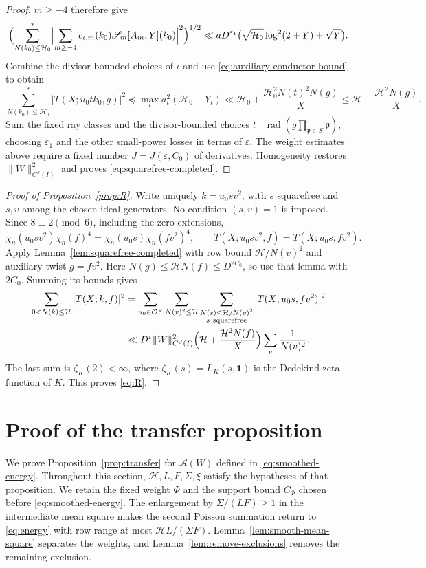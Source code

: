 \documentclass[11pt,a4paper]{article}
\numberwithin{equation}{section}
\numberwithin{figure}{section}
\theoremstyle{definition}
\theoremstyle{remark}
\newcommand{\OO}{\mathcal O}
\newcommand{\rad}{\operatorname{rad}}
\newcommand{\precbd}{\preccurlyeq}
\begin{document}
\begin{proof}
$m\ge-4$ therefore give
\[
 \Bigl(\sum_{N(k_0)\le\mathcal H_0}^*
   \Bigl|\sum_{m\ge-4}c_{\iota,m}(k_0)
       \mathscr S_m[A_m,Y](k_0)\Bigr|^2\Bigr)^{1/2}
 \ll aD^{\varepsilon_1}
       \bigl(\sqrt{\mathcal H_0}\log^2(2+Y)+\sqrt Y\bigr).
\]
Combine the divisor-bounded choices of $\iota$ and use
\eqref{eq:auxiliary-conductor-bound} to obtain
\[
 \sum_{N(k_0)\le\mathcal H_0}^*|T(X;u_0tk_0,g)|^2
 \precbd\max_\iota a_\iota^2(\mathcal H_0+Y_\iota)
 \ll\mathcal H_0+\frac{\mathcal H_0^2N(t)^2N(g)}X
 \le\mathcal H+\frac{\mathcal H^2N(g)}X.
\]
Sum the fixed ray classes and the divisor-bounded choices
$t\mid\rad(g\prod_{\mathfrak p\in S}\mathfrak p)$, choosing
$\varepsilon_1$ and the other small-power losses in terms of
$\varepsilon$. The weight estimates above require a fixed number
$J=J(\varepsilon,C_0)$ of derivatives. Homogeneity restores
$\|W\|_{C^J(I)}^2$ and proves \eqref{eq:squarefree-completed}.
\end{proof}

\begin{proof}[Proof of Proposition~\ref{prop:R}]
Write uniquely $k=u_0sv^2$, with $s$ squarefree and $s,v$ among
the chosen ideal generators. No condition $(s,v)=1$ is imposed.
Since $8\equiv2\pmod6$, including the zero extensions,
\[
 \chi_n(u_0sv^2)\chi_n(f)^4
 =\chi_n(u_0s)\chi_n(fv^2)^4,\qquad
 T(X;u_0sv^2,f)=T(X;u_0s,fv^2).
\]
Apply Lemma~\ref{lem:squarefree-completed} with row bound
$\mathcal H/N(v)^2$ and auxiliary twist $g=fv^2$.
Here $N(g)\le\mathcal H N(f)\le D^{2C_0}$, so use that lemma
with $2C_0$. Summing its bounds gives
\[
 \begin{aligned}
 \sum_{0<N(k)\le\mathcal H}|T(X;k,f)|^2
 &=\sum_{u_0\in\OO^\times}\sum_{N(v)^2\le\mathcal H}
   \sum_{\substack{N(s)\le\mathcal H/N(v)^2\\s\ {\rm squarefree}}}
   |T(X;u_0s,fv^2)|^2\\
 &\ll D^\varepsilon\|W\|_{C^J(I)}^2
   \Bigl(\mathcal H+\frac{\mathcal H^2N(f)}X\Bigr)
   \sum_v\frac1{N(v)^2}.
 \end{aligned}
\]
The last sum is $\zeta_K(2)<\infty$, where $\zeta_K(s)=L_K(s,\mathbf1)$ is the Dedekind zeta function of $K$. This proves \eqref{eq:R}.
\end{proof}


\section{Proof of the transfer proposition}\label{sec:transfer-proof}

We prove Proposition~\ref{prop:transfer} for
$\mathcal A(W)$ defined in \eqref{eq:smoothed-energy}.
Throughout this section, $\mathcal H,L,F,\Sigma,\xi$ satisfy the
hypotheses of that proposition. We retain the fixed weight $\Phi$
and the support bound $C_\Phi$ chosen before \eqref{eq:smoothed-energy}.
The enlargement by $\Sigma/(LF)\ge1$ in the intermediate mean square
makes the second Poisson summation return to \eqref{eq:energy} with
row range at most $\mathcal HL/(\Sigma F)$.
Lemma~\ref{lem:smooth-mean-square} separates the weights, and
Lemma~\ref{lem:remove-exclusions} removes the remaining exclusion.
\end{document}
